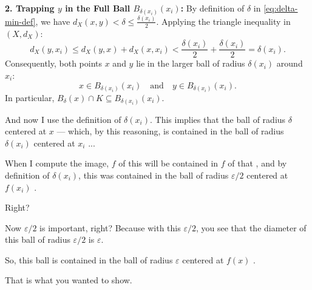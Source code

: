 \begin{proofWrapper}
\begin{content}
\textbf{2. Trapping $y$ in the Full Ball $B_{\delta(x_i)}(x_i)$:}
By definition of $\delta$ in \eqref{eq:delta-min-def}, we have $d_X(x, y) < \delta \le \frac{\delta(x_i)}{2}$.
Applying the triangle inequality in $(X, d_X)$:
\begin{equation}\label{eq:y-in-full-ball}
d_X(y, x_i) \le d_X(y, x) + d_X(x, x_i) < \frac{\delta(x_i)}{2} + \frac{\delta(x_i)}{2} = \delta(x_i).
\end{equation}
Consequently, both points $x$ and $y$ lie in the larger ball of radius $\delta(x_i)$ around $x_i$:
\[
x \in B_{\delta(x_i)}(x_i) \quad \text{and} \quad y \in B_{\delta(x_i)}(x_i).
\]
In particular, $B_\delta(x) \cap K \subseteq B_{\delta(x_i)}(x_i)$.
\end{content}

\begin{speech}[01:22:10 - 01:23:42]
And now I use the definition of $\delta(x_i)$. This implies that the ball of radius $\delta$ centered at $x$ --- which, by this reasoning, is contained in the ball of radius $\delta(x_i)$ centered at $x_i$ ...

When I compute the image, $f$ of this will be contained in $f$ of that , and by definition of $\delta(x_i)$, this was contained in the ball of radius $\varepsilon/2$ centered at $f(x_i)$ .

Right?

Now $\varepsilon/2$ is important, right? Because with this $\varepsilon/2$, you see that the diameter of this ball of radius $\varepsilon/2$ is $\varepsilon$.

So, this ball is contained in the ball of radius $\varepsilon$ centered at $f(x)$ .

That is what you wanted to show.
\end{speech}


\end{proofWrapper}
